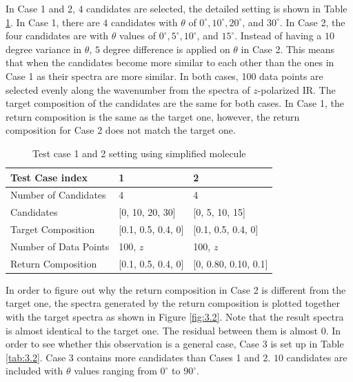 In Case 1 and 2, $4$ candidates are selected, the detailed setting is shown in Table \ref{tab:3.1}. In Case 1, there are $4$ candidates with $\theta$ of $0^{\circ}, 10^{\circ}, 20^{\circ}$, and $30^{\circ}$. In Case 2, the four candidates are with $\theta$ values of $0^{\circ}, 5^{\circ}, 10^{\circ}$, and $15^{\circ}$. Instead of having a $10$ degree variance in $\theta$, $5$ degree difference is applied on $\theta$ in Case 2. This means that when the candidates become more similar to each other than the ones in Case 1 as their spectra are more similar. In both cases, 100 data points are selected evenly along the wavenumber from the spectra of $z$-polarized IR. The target composition of the candidates are the same for both cases. In Case 1, the return composition is the same as the target one, however, the return composition for Case 2 does not match the target one. \\

\begin{table} 
\begin{center}
{\def\arraystretch{1.5}
\begin{tabular}{| l | l | l | }
\hline
Test Case index & 1 & 2  \\
\hline
Number of Candidates & 4 & 4  \\
\hline
Candidates & [0, 10, 20, 30] & [0, 5, 10, 15] \\
\hline
Target Composition & [0.1, 0.5, 0.4, 0] & [0.1, 0.5, 0.4, 0]     \\
\hline
Number of Data Points & 100, $z$ &  100, $z$     \\
\hline
Return Composition & [0.1, 0.5, 0.4, 0] & [0, 0.80, 0.10, 0.1] \\
\hline
\end{tabular} 
}
\end{center}
\caption{Test case 1 and 2 setting using simplified molecule}
\label{tab:3.1}
\end{table}	

In order to figure out why the return composition in Case 2 is different from the target one, the spectra generated by the return composition is plotted together with the target spectra as shown in Figure \ref{fig:3.2}. Note that the result spectra is almost identical to the target one. The residual between them is almost $0$. In order to see whether this observation is a general case, Case 3 is set up in Table \ref{tab:3.2}. Case 3 contains more candidates than Cases 1 and 2. $10$ candidates are included with $\theta$ values ranging from $0^{\circ}$ to $90^{\circ}$.  \\

